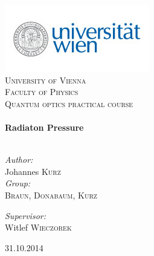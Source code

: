 \begin{titlepage}
\begin{center}

\includegraphics[scale=0.75]{./unilogo}~\\[2cm]

\textsc{\LARGE University of Vienna }\\[0.5cm]
\textsc{\LARGE Faculty of Physics}\\[1.5cm]
\textsc{\Large Quantum optics practical course}\\[0.5cm]

\HRule \\[0.4cm]
{ \huge \bfseries Radiaton Pressure}\\[0.4cm]

\HRule \\[1.5cm]

\begin{minipage}{0.4\textwidth}
\begin{flushleft} \large
\emph{Author:}\\
Johannes \textsc{Kurz}\\
\emph{Group:}\\
\textsc{Braun, Donabaum, Kurz}\\
\end{flushleft}
\end{minipage}
\begin{minipage}{0.4\textwidth}
\begin{flushright} \large
\emph{Supervisor:} \\
Witlef \textsc{Wieczorek}
\end{flushright}
\end{minipage}

\vfill

{\large 31.10.2014}

\end{center}
\end{titlepage}